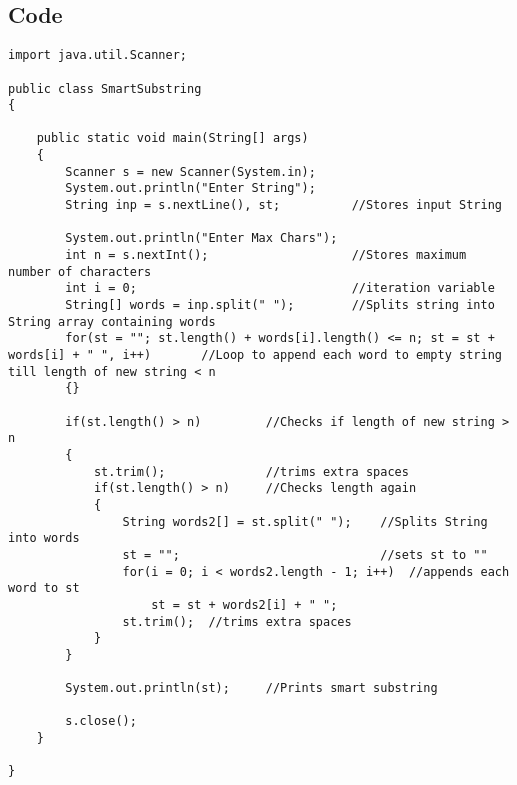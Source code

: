 \documentclass[ProgramminAssignment.tex]{subfiles}
\begin{document}
\subsection{Code}
\begin{lstlisting}
import java.util.Scanner;

public class SmartSubstring
{

	public static void main(String[] args)
	{
		Scanner s = new Scanner(System.in);
		System.out.println("Enter String");
		String inp = s.nextLine(), st;			//Stores input String
		
		System.out.println("Enter Max Chars");	
		int n = s.nextInt();					//Stores maximum number of characters
		int i = 0;								//iteration variable
		String[] words = inp.split(" ");		//Splits string into String array containing words
		for(st = ""; st.length() + words[i].length() <= n; st = st + words[i] + " ", i++)		//Loop to append each word to empty string till length of new string < n
		{}
		
		if(st.length() > n)			//Checks if length of new string > n
		{
			st.trim();				//trims extra spaces
			if(st.length() > n)		//Checks length again
			{
				String words2[] = st.split(" ");	//Splits String into words
				st = "";							//sets st to ""
				for(i = 0; i < words2.length - 1; i++)	//appends each word to st
					st = st + words2[i] + " ";
				st.trim();	//trims extra spaces
			}
		}
		
		System.out.println(st);		//Prints smart substring
		
		s.close();
	}

}

\end{lstlisting}
\end{document}
